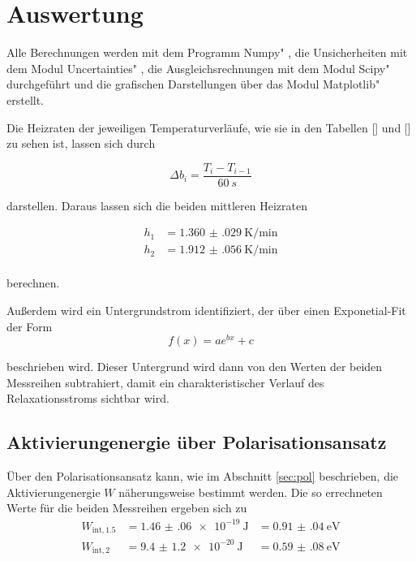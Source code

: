 \section{Auswertung}
\label{sec:Auswertung}
Alle Berechnungen werden mit dem Programm \glqq Numpy" \cite{numpy}, die Unsicherheiten mit dem Modul \glqq Uncertainties" \cite{uncertainties}, die Ausgleichsrechnungen mit dem Modul \glqq Scipy" \cite{scipy} durchgeführt und die grafischen Darstellungen über das Modul \glqq Matplotlib" \cite{matplotlib} erstellt.

Die Heizraten der jeweiligen Temperaturverläufe, wie sie in den Tabellen [] und [] zu sehen ist, lassen sich durch 

\begin{equation}
    \Delta b_i = \frac{T_i - T_{i-1}}{\SI{60}{s} }
\end{equation}

darstellen. Daraus lassen sich die beiden mittleren Heizraten 

\begin{align*}
    h_1 &=  \SI{1.360(029)}{\kelvin\per\minute}  \\
    h_2 &=  \SI{1.912(056)}{\kelvin\per\minute} \\
\end{align*}

berechnen. 

Außerdem wird ein Untergrundstrom identifiziert, der über einen Exponetial-Fit der Form 
\begin{equation}
    f(x) = a e^{bx} + c
\end{equation}

beschrieben wird. Dieser Untergrund wird dann von den Werten der beiden Messreihen subtrahiert, damit ein charakteristischer Verlauf des Relaxationsstroms sichtbar wird. 

\subsection{Aktivierungenergie über Polarisationsansatz}

Über den Polarisationsansatz kann, wie im Abschnitt \ref{sec:pol} beschrieben, die Aktivierungenergie $W$ näherungsweise bestimmt werden.
Die so errechneten Werte für die beiden Messreihen ergeben sich zu 
\begin{align*}
    W_{\text{int},1.5} &= \SI{1.46(06)e-19}{\joule} &= \SI{0.91(04)}{\electronvolt} \\
    W_{\text{int},2}   &= \SI{9.4(12)e-20}{\joule} &= \SI{0.59(08)}{\electronvolt} \\
\end{align*}


